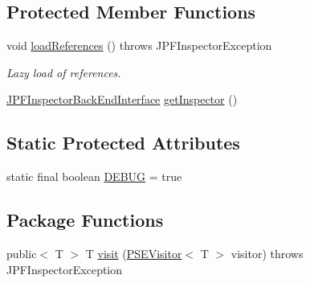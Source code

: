 \subsection*{Protected Member Functions}
\begin{DoxyCompactItemize}
\item 
void \hyperlink{classgov_1_1nasa_1_1jpf_1_1inspector_1_1common_1_1pse_1_1_p_s_e_variable_object_ab69b94f46752e6d5768590ce52371573}{load\+References} ()  throws J\+P\+F\+Inspector\+Exception 
\begin{DoxyCompactList}\small\item\em Lazy load of references. \end{DoxyCompactList}\item 
\hyperlink{interfacegov_1_1nasa_1_1jpf_1_1inspector_1_1interfaces_1_1_j_p_f_inspector_back_end_interface}{J\+P\+F\+Inspector\+Back\+End\+Interface} \hyperlink{classgov_1_1nasa_1_1jpf_1_1inspector_1_1common_1_1pse_1_1_program_state_entry_ab04eadea7420b70405969a6b95656411}{get\+Inspector} ()
\end{DoxyCompactItemize}
\subsection*{Static Protected Attributes}
\begin{DoxyCompactItemize}
\item 
static final boolean \hyperlink{classgov_1_1nasa_1_1jpf_1_1inspector_1_1common_1_1pse_1_1_program_state_entry_a84ef5e9f23ec651d7a67a8ee72819b0e}{D\+E\+B\+UG} = true
\end{DoxyCompactItemize}
\subsection*{Package Functions}
\begin{DoxyCompactItemize}
\item 
public$<$ T $>$ T \hyperlink{classgov_1_1nasa_1_1jpf_1_1inspector_1_1common_1_1pse_1_1_p_s_e_variable_object_aa1c05f503dcce4d9d642c668b176655d}{visit} (\hyperlink{interfacegov_1_1nasa_1_1jpf_1_1inspector_1_1common_1_1pse_1_1_p_s_e_visitor}{P\+S\+E\+Visitor}$<$ T $>$ visitor)  throws J\+P\+F\+Inspector\+Exception 
\end{DoxyCompactItemize}
